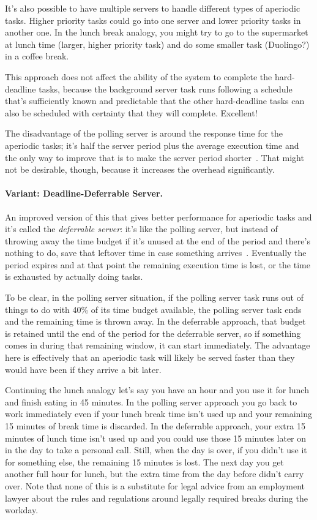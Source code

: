 It's also possible to have multiple servers to handle different types of aperiodic tasks. Higher priority tasks could go into one server and lower priority tasks in another one. In the lunch break analogy, you might try to go to the supermarket at lunch time (larger, higher priority task) and do some smaller task (Duolingo?) in a coffee break.

This approach does not affect the ability of the system to complete the hard-deadline tasks, because the background server task runs following a schedule that's sufficiently known and predictable that the other hard-deadline tasks can also be scheduled with certainty that they will complete. Excellent!

The disadvantage of the polling server is around the response time for the aperiodic tasks; it's half the server period plus the average execution time and the only way to improve that is to make the server period shorter~\cite{aperiodic-server}. That might not be desirable, though, because it increases the overhead significantly. 

\paragraph{Variant: Deadline-Deferrable Server.}
An improved version of this that gives better performance for aperiodic tasks and it's called the \textit{deferrable server}: it's like the polling server, but instead of throwing away the time budget if it's unused at the end of the period and there's nothing to do, save that leftover time in case something arrives~\cite{aperiodic-server}. Eventually the period expires and at that point the remaining execution time is lost, or the time is exhausted by actually doing tasks.

To be clear, in the polling server situation, if the polling server task runs out of things to do with 40\% of its time budget available, the polling server task ends and the remaining time is thrown away. In the deferrable approach, that budget is retained until the end of the period for the deferrable server, so if something comes in during that remaining window, it can start immediately. The advantage here is effectively that an aperiodic task will likely be served faster than they would have been if they arrive a bit later.

Continuing the lunch analogy let's say you have an hour and you use it for lunch and finish eating in 45 minutes. In the polling server approach you go back to work immediately even if your lunch break time isn't used up and your remaining 15 minutes of break time is discarded. In the deferrable approach, your extra 15 minutes of lunch time isn't used up and you could use those 15 minutes later on in the day to take a personal call. Still, when the day is over, if you didn't use it for something else, the remaining 15 minutes is lost. The next day you get another full hour for lunch, but the extra time from the day before didn't carry over. Note that none of this is a substitute for legal advice from an employment lawyer about the rules and regulations around legally required breaks during the workday.

